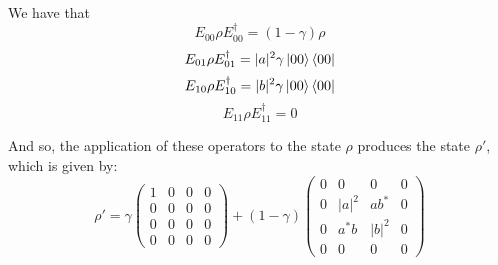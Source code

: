 \documentclass{masterthesis}
\begin{document}

We have that
\begin{equation}
    E_{00} \rho E_{00}^{\dagger} = (1-\gamma) \rho
\end{equation}
\begin{equation}
    E_{01} \rho E_{01}^{\dagger} = |a|^2 \gamma \ket{00}\bra{00}
\end{equation}
\begin{equation}
    E_{10} \rho E_{10}^{\dagger} = |b|^2 \gamma \ket{00}\bra{00}
\end{equation}
\begin{equation}
    E_{11} \rho E_{11}^{\dagger} = 0
\end{equation}

And so, the application of these operators to the state $\rho$ produces the state $\rho'$, which is given by:
\begin{equation}\label{eq:ad-dual-rail}
    \rho' = \gamma\begin{pmatrix} 1 & 0 & 0 & 0 \\ 0 & 0 & 0 & 0 \\ 0 & 0 & 0 & 0 \\ 0 & 0 & 0 & 0 \end{pmatrix} + (1-\gamma)\begin{pmatrix} 0 & 0 & 0 & 0 \\ 0 & |a|^{2} & a b^{*} & 0 \\ 0 & a^{*} b & |b|^{2} & 0 \\ 0 & 0 & 0 & 0 \end{pmatrix}
\end{equation}
\end{document}
